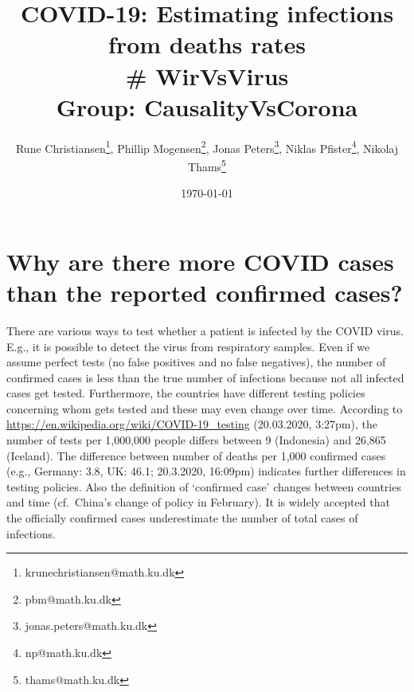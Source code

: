 \documentclass[a4paper]{article}
\title{COVID-19: Estimating infections from deaths rates \\ \# WirVsVirus\\
Group: CausalityVsCorona}
\author{Rune Christiansen\thanks{krunechristiansen@math.ku.dk}, Phillip Mogensen\thanks{pbm@math.ku.dk}, Jonas Peters\thanks{jonas.peters@math.ku.dk}, Niklas Pfister\thanks{np@math.ku.dk}, Nikolaj Thams\thanks{thams@math.ku.dk}}
\date{\today}
\newcommand\todo[1]{{\color{red}todo: #1}}
\begin{document}
\maketitle


\begin{center}
\end{center}



\section{Why are there more COVID cases 
than the reported confirmed cases?}
There are various ways to test whether a patient is infected by the
COVID virus. E.g., it is possible to detect the virus from respiratory
samples.  Even if we assume perfect tests (no false positives and no
false negatives), the number of confirmed cases is less than the true
number of infections because not all infected cases get tested.
Furthermore, the countries have different testing policies concerning
whom gets tested and these may even change over time.  According to
\url{https://en.wikipedia.org/wiki/COVID-19_testing} (20.03.2020,
3:27pm), the number of tests per 1,000,000 people differs between 9
(Indonesia) and 26,865 (Iceland).  The difference between number of
deaths per 1,000 confirmed cases (e.g., Germany: 3.8, UK: 46.1;
20.3.2020, 16:09pm) indicates further differences in testing policies.
Also the definition of `confirmed case' changes between countries and
time (cf.\ China's change of policy in February).
It is widely accepted that the officially confirmed cases
underestimate the number of total cases of infections.
\end{document}
